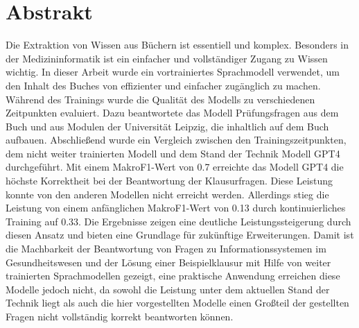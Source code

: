 \chapter*{Abstrakt}
Die Extraktion von Wissen aus Büchern ist essentiell und komplex.
Besonders in der Medizininformatik ist ein einfacher und vollständiger Zugang zu Wissen wichtig.
In dieser Arbeit wurde ein vortrainiertes Sprachmodell verwendet, um den Inhalt des Buches  von \citet{bb} effizienter und einfacher zugänglich zu machen.
Während des Trainings wurde die Qualität des Modells zu verschiedenen Zeitpunkten evaluiert.
Dazu beantwortete das Modell Prüfungsfragen aus dem Buch und aus Modulen der Universität Leipzig, die inhaltlich auf dem Buch aufbauen.
Abschließend wurde ein Vergleich zwischen den Trainingszeitpunkten, dem nicht weiter trainierten Modell und dem Stand der Technik Modell GPT4 durchgeführt.
Mit einem MakroF1-Wert von \num{0,7} erreichte das Modell GPT4 die höchste Korrektheit bei der Beantwortung der Klausurfragen.
Diese Leistung konnte von den anderen Modellen nicht erreicht werden.
Allerdings stieg die Leistung von einem anfänglichen MakroF1-Wert von \num{0,13} durch kontinuierliches Training auf \num{0,33}.
Die Ergebnisse zeigen eine deutliche Leistungssteigerung durch diesen Ansatz und bieten eine Grundlage für zukünftige Erweiterungen.
Damit ist die Machbarkeit der Beantwortung von Fragen zu Informationssystemen im Gesundheitswesen und der Lösung einer Beispielklausur mit Hilfe von weiter trainierten Sprachmodellen gezeigt, eine praktische Anwendung erreichen diese Modelle jedoch nicht, da sowohl die Leistung unter dem aktuellen Stand der Technik liegt als auch die hier vorgestellten Modelle einen Großteil der gestellten Fragen nicht vollständig korrekt beantworten können.
\vfill
